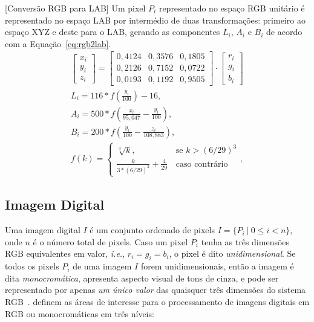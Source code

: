\begin{definition}\label{def:rgb2lab}[Conversão RGB para LAB]
Um pixel $P_i$ representado no espaço RGB unitário é representado no espaço LAB por intermédio de duas transformações: primeiro ao espaço XYZ e deste para o LAB, gerando as componentes $L_i$, $A_i$ e $B_i$ de acordo com a Equação~\eqref{eq:rgb2lab}. 
\begin{equation} \label{eq:rgb2lab}
\begin{split}
\begin{bmatrix}
    x_i\\
    y_i\\
    z_i
\end{bmatrix}
=
\begin{bmatrix}
    0,4124 & 0,3576 & 0,1805 \\
    0,2126 & 0,7152 & 0,0722 \\
    0,0193 & 0,1192 & 0,9505
\end{bmatrix}
\cdot
\begin{bmatrix}
    r_i\\
    g_i\\
    b_i
\end{bmatrix}
\\
L_i = 116*f\left(\frac{y_i}{100}\right) - 16,\\
A_i = 500*f\left(\frac{x_i}{95,047} - \frac{y_i}{100}\right), \\
B_i = 200*f\left(\frac{y_i}{100} - \frac{z_i}{108,883}\right),\\
f(k) =
\begin{cases}
    \sqrt[3]{k},     & \text{se } k > (6/29)^3 \\
    \frac{k}{3*(6/29)^2} + \frac{4}{29}\,   & \text{caso contrário}
\end{cases},
\end{split}
\end{equation} 

\end{definition}

\subsection{Imagem Digital}

Uma imagem digital $I$ é um conjunto ordenado de pixels $ I = \{P_i ~ | ~ 0 \leq i <n \}$, onde $n$ é o número total de pixels.
Caso um pixel $P_i$ tenha as três dimensões RGB equivalentes em valor, \textit{i.e.}, $r_i = g_i = b_i$, o pixel é dito \textit{unidimensional}.
Se todos os pixels $P_i$ de uma imagem $I$ forem unidimensionais, então a imagem é dita \textit{monocromática}, apresenta aspecto visual de tons de cinza, e pode ser representado por apenas \textit{um único valor} das quaisquer três dimensões do sistema RGB~\cite{Sonka1993,johnson2003,Chang1996}.
 definem as áreas de interesse para o processamento de imagens digitais em RGB ou monocromáticas em três níveis:

